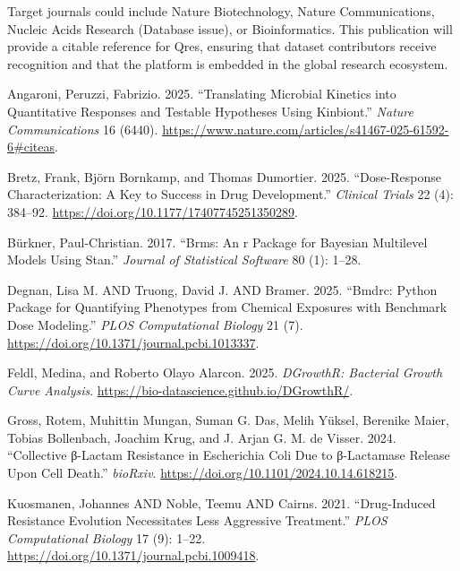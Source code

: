 \documentclass[
]{article}
\newlength{\cslhangindent}
\newenvironment{CSLReferences}[2] %
 {\begin{list}{}{%
  \setlength{\itemindent}{0pt}
  \setlength{\leftmargin}{0pt}
  \setlength{\parsep}{0pt}
  \ifodd #1
   \setlength{\leftmargin}{\cslhangindent}
   \setlength{\itemindent}{-1\cslhangindent}
  \fi
  \setlength{\itemsep}{#2\baselineskip}}}
 {\end{list}}
\begin{document}
Target journals could include Nature Biotechnology, Nature
Communications, Nucleic Acids Research (Database issue), or
Bioinformatics. This publication will provide a citable reference for
Qres, ensuring that dataset contributors receive recognition and that
the platform is embedded in the global research ecosystem.

\label{refs}
\begin{CSLReferences}{1}{0}
Angaroni, Peruzzi, Fabrizio. 2025. {``Translating Microbial Kinetics
into Quantitative Responses and Testable Hypotheses Using Kinbiont.''}
\emph{Nature Communications} 16 (6440).
\url{https://www.nature.com/articles/s41467-025-61592-6\#citeas}.

Bretz, Frank, Björn Bornkamp, and Thomas Dumortier. 2025.
{``Dose-Response Characterization: A Key to Success in Drug
Development.''} \emph{Clinical Trials} 22 (4): 384--92.
\url{https://doi.org/10.1177/17407745251350289}.

Bürkner, Paul-Christian. 2017. {``Brms: An r Package for Bayesian
Multilevel Models Using Stan.''} \emph{Journal of Statistical Software}
80 (1): 1--28.

Degnan, Lisa M. AND Truong, David J. AND Bramer. 2025. {``Bmdrc: Python
Package for Quantifying Phenotypes from Chemical Exposures with
Benchmark Dose Modeling.''} \emph{PLOS Computational Biology} 21 (7).
\url{https://doi.org/10.1371/journal.pcbi.1013337}.

Feldl, Medina, and Roberto Olayo Alarcon. 2025. \emph{DGrowthR:
Bacterial Growth Curve Analysis}.
\url{https://bio-datascience.github.io/DGrowthR/}.

Gross, Rotem, Muhittin Mungan, Suman G. Das, Melih Yüksel, Berenike
Maier, Tobias Bollenbach, Joachim Krug, and J. Arjan G. M. de Visser.
2024. {``Collective β-Lactam Resistance in Escherichia Coli Due to
β-Lactamase Release Upon Cell Death.''} \emph{bioRxiv}.
\url{https://doi.org/10.1101/2024.10.14.618215}.

Kuosmanen, Johannes AND Noble, Teemu AND Cairns. 2021. {``Drug-Induced
Resistance Evolution Necessitates Less Aggressive Treatment.''}
\emph{PLOS Computational Biology} 17 (9): 1--22.
\url{https://doi.org/10.1371/journal.pcbi.1009418}.


\end{CSLReferences}
\end{document}
